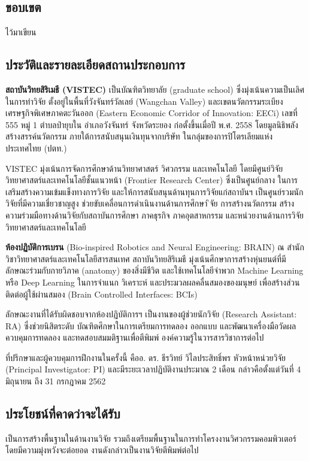 \documentclass[16pt,a4]{internshipreport}
\begin{document}
\subsection{ขอบเขต}
ไว้มาเขียน

\subsection{ประวัติและรายละเอียดสถานประกอบการ}
\textbf{สถาบันวิทยสิริเมธี (VISTEC)} เป็นบัณฑิตวิทยาลัย (graduate school) ซึ่งมุ่งเน้นความเป็นเลิศในการทำวิจัย 
ตั้งอยู่ในพื้นที่วังจันทร์วัลเลย์ (Wangchan Valley) และเขตนวัตกรรมระเบียงเศรษฐกิจพิเศษภาคตะวันออก
(Eastern Economic Corridor of Innovation: EECi) เลขที่ 555 หมู่ 1 ตำบลป่ายุบใน อำเภอวังจันทร์ จังหวัดระยอง
ก่อตั้งขึ้นเมื่อปี พ.ศ. 2558 โดยมูลนิธิพลังสร้างสรรค์นวัตกรรม ภายใต้การสนับสนุนเงินทุนจากบริษัท
ในกลุ่มของการปิโตรเลียมแห่งประเทศไทย (ปตท.)

VISTEC มุ่งเน้นการจัดการศึกษาด้านวิทยาศาสตร์ วิศวกรรม และเทคโนโลยี โดยมีศูนย์วิจัยวิทยาศาสตร์และเทคโนโลยีชั้นแนวหน้า
(Frontier Research Center) ซึ่งเป็นศูนย์กลาง ในการเสริมสร้างความเข้มแข็งทางการวิจัย
และให้การสนับสนุนด้านทุนการวิจัยแก่สถาบันฯ เป็นศูนย์รวมนักวิจัยที่มีความเชี่ยวชาญสูง ช่วยขับเคลื่อนการดำเนินงานด้านการศึกษา 
ิจัย การสร้างนวัตกรรม สร้างความร่วมมือทางด้านวิจัยกับสถาบันการศึกษา ภาคธุรกิจ ภาคอุตสาหกรรม
และหน่วยงานด้านการวิจัยวิทยาศาสตร์และเทคโนโลยี

\textbf{ห้องปฏิบัติการเบรน} (Bio-inspired Robotics and Neural Engineering: BRAIN)
ณ สำนักวิชาวิทยาศาสตร์และเทคโนโลยีสารสนเทศ สถาบันวิทยสิริเมธี มุ่งเน้นศึกษาการสร้างหุ่นยนต์ที่มีลักษณะร่วมกับกายวิภาค (anatomy) ของสิ่งมีชีวิต และใช้เทคโนโลยีจำพวก Machine Learning หรือ Deep Learning ในการจำแนก วิเคราะห์
และประมวลผลคลื่นสมองของมนุษย์ เพื่อสร้างส่วนติดต่อผู้ใช้ผ่านสมอง (Brain Controlled Interfaces: BCIs)

ลักษณะงานที่ได้รับผิดชอบจากห้องปฏิบัติการฯ เป็นงานของผู้ช่วยนักวิจัย (Research Assistant: RA) ซึ่งช่วยนิสิตระดับ
บัณฑิตศึกษาในการเตรียมการทดลอง ออกแบบ และพัฒนาเครื่องมือวัดผล ควบคุมการทดลอง และทดสอบสมมติฐานเพื่อตีพิมพ์
องค์ความรู้ในวารสารวิชาการต่อไป

ที่ปรึกษาและผู้ควบคุมการฝึกงานในครั้งนี้ คืออ. ดร. ธีรวิทย์ วิไลประสิทธิ์พร หัวหน้าหน่วยวิจัย (Principal Investigator: PI)
และมีระยะเวลาปฏิบัติงานประมาณ 2 เดือน กล่าวคือตั้งแต่วันที่ 4 มิถุนายน ถึง 31 กรกฎาคม 2562

\subsection{ประโยชน์ที่คาดว่าจะได้รับ}
เป็นการสร้างพื้นฐานในด้านงานวิจัย รวมถึงเตรียมพื้นฐานในการทำโครงงานวิศวกรรมคอมพิวเตอร์ โดยมีความมุ่งหวังจะต่อยอด
งานดังกล่าวเป็นงานวิจัยตีพิมพ์ต่อไป
\end{document}
